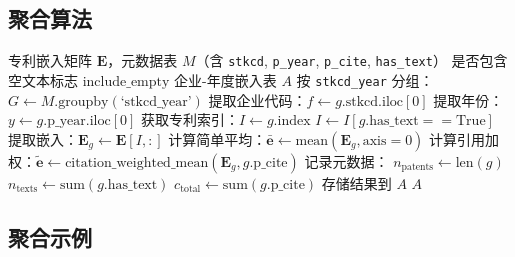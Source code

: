 \documentclass[12pt,a4paper]{article}
\theoremstyle{definition}
\newcommand{\vect}[1]{\mathbf{#1}}
\newcommand{\mat}[1]{\mathbf{#1}}
\begin{document}
\subsection{聚合算法}

\begin{algorithm}[H]
    \caption{企业-年度聚合}
    \label{alg:aggregation}
    \begin{algorithmic}[1]
        \Require 专利嵌入矩阵 $\mat{E}$，元数据表 $M$（含 \texttt{stkcd}, \texttt{p\_year}, \texttt{p\_cite}, \texttt{has\_text}）
        \Require 是否包含空文本标志 $\text{include\_empty}$
        \Ensure 企业-年度嵌入表 $A$
        \State 按 \texttt{stkcd\_year} 分组：$G \leftarrow M.\text{groupby}(\text{`stkcd\_year'})$
            \State 提取企业代码：$f \leftarrow g.\text{stkcd}.\text{iloc}[0]$
            \State 提取年份：$y \leftarrow g.\text{p\_year}.\text{iloc}[0]$
            \State 获取专利索引：$I \leftarrow g.\text{index}$
                \State $I \leftarrow I[g.\text{has\_text} == \text{True}]$
            \EndIf
            \State 提取嵌入：$\mat{E}_g \leftarrow \mat{E}[I, :]$
            \State 计算简单平均：$\bar{\vect{e}} \leftarrow \text{mean}(\mat{E}_g, \text{axis}=0)$
            \State 计算引用加权：$\tilde{\vect{e}} \leftarrow \text{citation\_weighted\_mean}(\mat{E}_g, g.\text{p\_cite})$
            \State 记录元数据：
            \State \quad $n_{\text{patents}} \leftarrow \text{len}(g)$
            \State \quad $n_{\text{texts}} \leftarrow \text{sum}(g.\text{has\_text})$
            \State \quad $c_{\text{total}} \leftarrow \text{sum}(g.\text{p\_cite})$
            \State 存储结果到 $A$
        \EndFor
        \State \Return $A$
    \end{algorithmic}
\end{algorithm}

\subsection{聚合示例}
\end{document}
